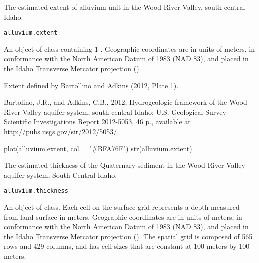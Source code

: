 \documentclass[a4paper]{book}
\begin{document}
%
\begin{Description}\relax
The estimated extent of alluvium unit in the Wood River Valley, south-central Idaho.
\end{Description}
%
\begin{Usage}
\begin{verbatim}
alluvium.extent
\end{verbatim}
\end{Usage}
%
\begin{Format}
An object of  class containing 1 .
Geographic coordinates are in units of meters, in conformance with the North American Datum of 1983 (NAD 83), and placed in the
Idaho Transverse Mercator projection ().
\end{Format}
%
\begin{Source}\relax
Extent defined by Bartollino and Adkins (2012, Plate 1).
\end{Source}
%
\begin{References}\relax
Bartolino, J.R., and Adkins, C.B., 2012, Hydrogeologic framework of the Wood River Valley aquifer system, south-central Idaho: U.S. Geological Survey Scientific Investigations Report 2012-5053, 46 p., available at \url{http://pubs.usgs.gov/sir/2012/5053/}.
\end{References}
%
\begin{Examples}
\begin{ExampleCode}
plot(alluvium.extent, col = "#BFA76F")
str(alluvium.extent)
\end{ExampleCode}
\end{Examples}
%
\begin{Description}\relax
The estimated thickness of the Quaternary sediment in the Wood River Valley aquifer system, South-Central Idaho.
\end{Description}
%
\begin{Usage}
\begin{verbatim}
alluvium.thickness
\end{verbatim}
\end{Usage}
%
\begin{Format}
An object of  class.
Each cell on the surface grid represents a depth measured from land surface in meters.
Geographic coordinates are in units of meters, in conformance with the North American Datum of 1983 (NAD 83), and placed in the
Idaho Transverse Mercator projection ().
The spatial grid is composed of 565 rows and 429 columns, and has cell sizes that are constant at 100 meters by 100 meters.
\end{Format}
\end{document}

